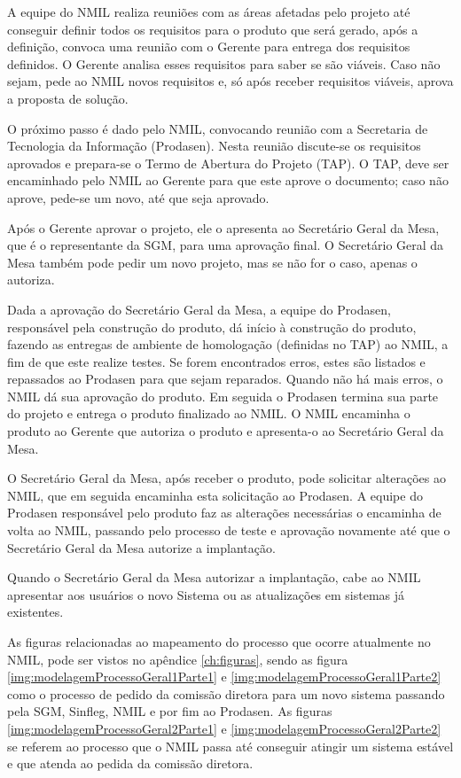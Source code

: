 A equipe do NMIL realiza reuniões com as áreas afetadas pelo projeto até conseguir
definir todos os requisitos para o produto que será gerado, após a definição, convoca uma reunião com o Gerente para entrega dos requisitos definidos. O Gerente analisa esses requisitos para saber se são viáveis. Caso não sejam, pede ao NMIL novos requisitos e, só após receber requisitos viáveis, aprova a proposta de solução.

O próximo passo é dado pelo NMIL, convocando reunião com a Secretaria de Tecnologia da Informação (Prodasen). Nesta reunião discute-se os requisitos aprovados e prepara-se o Termo de Abertura do Projeto (TAP). O TAP, deve ser encaminhado pelo NMIL ao Gerente para que este aprove o documento; caso não aprove, pede-se um novo, até que seja aprovado.

Após o Gerente aprovar o projeto, ele o apresenta ao Secretário Geral da Mesa, que é o representante da SGM, para uma aprovação final. O Secretário Geral da Mesa também pode pedir um novo projeto, mas se não for o caso, apenas o autoriza.

Dada a aprovação do Secretário Geral da Mesa, a equipe do Prodasen, responsável pela
construção do produto, dá início à construção do produto, fazendo as entregas de ambiente de homologação (definidas no TAP) ao NMIL, a fim de que este realize testes. Se forem encontrados erros, estes são listados e repassados ao Prodasen para que sejam reparados. Quando não há mais erros, o NMIL dá sua aprovação do produto. Em seguida o Prodasen termina sua parte do projeto e entrega o produto finalizado ao NMIL. O NMIL encaminha o produto ao
Gerente que autoriza o produto e apresenta-o ao Secretário Geral da Mesa.

O Secretário Geral da Mesa, após receber o produto, pode solicitar alterações ao NMIL,
que em seguida encaminha esta solicitação ao Prodasen. A equipe do Prodasen responsável pelo produto faz as alterações necessárias o encaminha de volta ao NMIL, passando pelo processo de teste e aprovação novamente até que o Secretário Geral da Mesa autorize a implantação.

Quando o Secretário Geral da Mesa autorizar a implantação, cabe ao NMIL apresentar
aos usuários o novo Sistema ou as atualizações em sistemas já existentes.

As figuras relacionadas ao mapeamento do processo que ocorre atualmente no NMIL, pode ser vistos no apêndice \ref{ch:figuras}, sendo as figura \ref{img:modelagemProcessoGeral1Parte1} e \ref{img:modelagemProcessoGeral1Parte2} como o processo de pedido da comissão diretora para um novo sistema passando pela SGM, Sinfleg, NMIL e por fim ao Prodasen. As figuras \ref{img:modelagemProcessoGeral2Parte1} e \ref{img:modelagemProcessoGeral2Parte2} se referem ao processo que o NMIL passa até conseguir atingir um sistema estável e que atenda ao pedida da comissão diretora.
